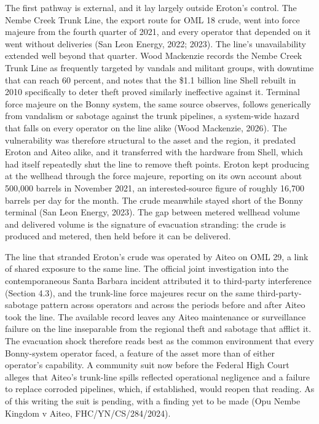 \documentclass[twoside,fontset=lmodern]{mitthesis}
\begin{document}
The first pathway is external, and it lay largely outside Eroton's
control. The Nembe Creek Trunk Line, the export route for OML 18 crude,
went into force majeure from the fourth quarter of 2021, and every
operator that depended on it went without deliveries (San Leon Energy,
2022; 2023). The line's unavailability extended well beyond that
quarter. Wood Mackenzie records the Nembe Creek Trunk Line as frequently
targeted by vandals and militant groups, with downtime that can reach 60
percent, and notes that the \$1.1 billion line Shell rebuilt in 2010
specifically to deter theft proved similarly ineffective against it.
Terminal force majeure on the Bonny system, the same source observes,
follows generically from vandalism or sabotage against the trunk
pipelines, a system-wide hazard that falls on every operator on the line
alike (Wood Mackenzie, 2026). The vulnerability was therefore structural
to the asset and the region, it predated Eroton and Aiteo alike, and it
transferred with the hardware from Shell, which had itself repeatedly
shut the line to remove theft points. Eroton kept producing at the
wellhead through the force majeure, reporting on its own account about
500,000 barrels in November 2021, an interested-source figure of roughly
16,700 barrels per day for the month. The crude meanwhile stayed short
of the Bonny terminal (San Leon Energy, 2023). The gap between metered
wellhead volume and delivered volume is the signature of evacuation
stranding: the crude is produced and metered, then held before it can be
delivered.

The line that stranded Eroton's crude was operated by Aiteo on OML 29, a
link of shared exposure to the same line. The official joint
investigation into the contemporaneous Santa Barbara incident attributed
it to third-party interference (Section 4.3), and the trunk-line force
majeures recur on the same third-party-sabotage pattern across operators
and across the periods before and after Aiteo took the line. The
available record leaves any Aiteo maintenance or surveillance failure on
the line inseparable from the regional theft and sabotage that afflict
it. The evacuation shock therefore reads best as the common environment
that every Bonny-system operator faced, a feature of the asset more than
of either operator's capability. A community suit now before the Federal
High Court alleges that Aiteo's trunk-line spills reflected operational
negligence and a failure to replace corroded pipelines, which, if
established, would reopen that reading. As of this writing the suit is
pending, with a finding yet to be made (Opu Nembe Kingdom v Aiteo,
FHC/YN/CS/284/2024).
\end{document}
